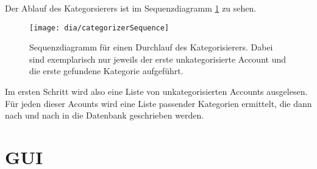 Der Ablauf des Kategorsierers ist im Sequenzdiagramm \ref{fig:categorizerSeq} zu sehen.
\begin{figure}[h]
	\texttt{[image: dia/categorizerSequence]}
	\caption{Sequenzdiagramm für einen Durchlauf des Kategorisierers. Dabei sind exemplarisch nur jeweils der erste unkategorisierte Account und die erste gefundene Kategorie aufgeführt.}
	\label{fig:categorizerSeq}
\end{figure}

Im ersten Schritt wird also eine Liste von unkategorisierten Accounts ausgelesen. Für jeden dieser Acounts wird eine Liste passender Kategorien ermittelt, die dann nach und nach in die Datenbank geschrieben werden.

\section{GUI}